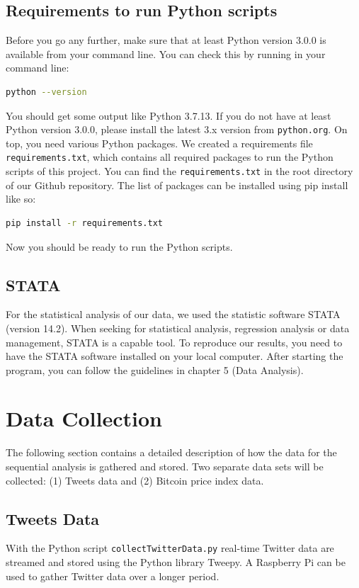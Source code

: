 \documentclass[a4paper,12pt]{article}
\begin{document}
\begin{spacing}{1.2}
\subsection{Requirements to run Python scripts}
Before you go any further, make sure that at least Python version 3.0.0 is available from your command line. You can check this by running in your command line:
\begin{lstlisting}[language=bash]
    python --version
\end{lstlisting}

You should get some output like Python 3.7.13. If you do not have at least Python version 3.0.0, please install the latest 3.x version from \verb|python.org|.
\newline \newline
On top, you need various Python packages. We created a requirements file \verb|requirements.txt|, which contains all required packages to run the Python scripts of this project. You can find the \verb|requirements.txt| in the root directory of our Github repository. The list of packages can be installed using pip install like so:

\begin{lstlisting}[language=bash]
    pip install -r requirements.txt
\end{lstlisting}
Now you should be ready to run the Python scripts.

\subsection{STATA}
For the statistical analysis of our data, we used the statistic software STATA (version 14.2). When seeking for statistical analysis, regression analysis or data management, STATA is a capable tool. To reproduce our results, you need to have the STATA software installed on your local computer. After starting the program, you can follow the guidelines in chapter 5 (Data Analysis). 

\clearpage

\section{Data Collection}
The following section contains a detailed description of how the data for the sequential analysis is gathered and stored. Two separate data sets will be collected: (1) Tweets data and (2) Bitcoin price index data.
\subsection{Tweets Data}
With the Python script \verb|collectTwitterData.py| real-time Twitter data are streamed and stored using the Python library Tweepy. A Raspberry Pi can be used to gather Twitter data over a longer period.

\end{spacing}
\end{document}
